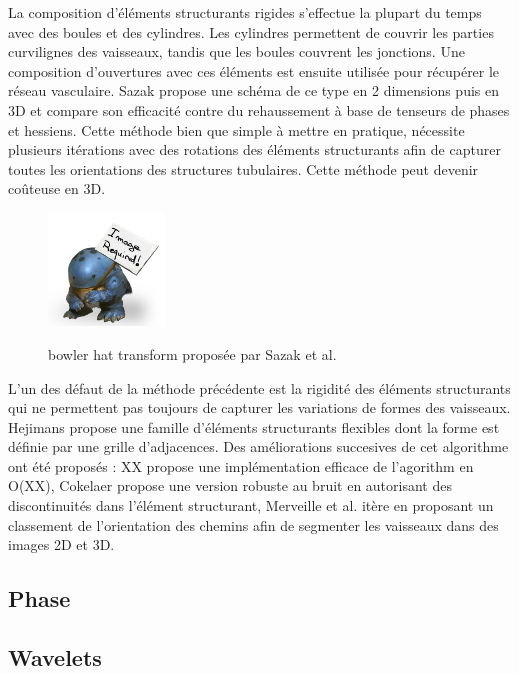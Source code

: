 La composition d'éléments structurants rigides s'effectue la plupart du temps avec des boules et des cylindres. Les cylindres permettent de couvrir les parties curvilignes des vaisseaux, tandis que les boules couvrent les jonctions. Une composition d'ouvertures avec ces éléments est ensuite utilisée pour récupérer le réseau vasculaire. Sazak propose une schéma de ce type en 2 dimensions \cite{sazak_2D} puis en 3D \cite{sazak_3D} et compare son efficacité contre du rehaussement à base de tenseurs de phases et hessiens. Cette méthode bien que simple à mettre en pratique, nécessite plusieurs itérations avec des rotations des éléments structurants afin de capturer toutes les orientations des structures tubulaires. Cette méthode peut devenir coûteuse en 3D.

\begin{figure}
  \centering
  \includegraphics[height=3cm]{Images/img_required.jpg}
  \label{fig:sazak_bowler_hat}
  \caption{bowler hat transform proposée par Sazak et al.}
\end{figure}

L'un des défaut de la méthode précédente est la rigidité des éléments structurants qui ne permettent pas toujours de capturer les variations de formes des vaisseaux. Hejimans \cite{Heijmans2005_path_opening} propose une famille d'éléments structurants flexibles dont la forme est définie par une grille d'adjacences. Des améliorations succesives de cet algorithme ont été proposés : XX propose une implémentation efficace de l'agorithm en O(XX), Cokelaer propose une version robuste au bruit en autorisant des discontinuités dans l'élément structurant, Merveille et al. itère en proposant un classement de l'orientation des chemins afin de segmenter les vaisseaux dans des images 2D et 3D.

\subsection{Phase}
\label{sec:EA:rehaussement:Phase}


\subsection{Wavelets}
\label{sec:EA:rehaussement:wavelets}

